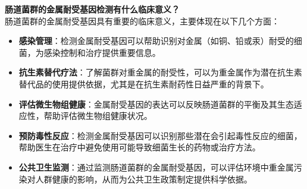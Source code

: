\documentclass[UTF8]{ctexart}
\begin{document}
\begin{tcolorbox}[
    enhanced,
    colback=lightpurple!10, %
    colframe=white,  %
    arc=3mm,
    boxrule=0.5pt,
    width=\textwidth,
    top=8pt,
    bottom=8pt
]
{\small{\color{lightpurple}\faQuestionCircle}\quad \textbf{肠道菌群的金属耐受基因检测有什么临床意义？}\\
{\color{orange!50}\faComments}\quad 肠道菌群的金属耐受基因具有重要的临床意义，主要体现在以下几个方面：
\begin{itemize}
    \item \textbf{感染管理}：检测金属耐受基因可以帮助识别对金属（如铜、铅或汞）耐受的细菌，为感染控制和治疗提供重要信息。
    \item \textbf{抗生素替代疗法}：了解菌群对重金属的耐受性，可以为重金属作为潜在抗生素替代品的使用提供依据，尤其是在抗生素耐药性日益严重的背景下。
    \item \textbf{评估微生物组健康}：金属耐受基因的表达可以反映肠道菌群的平衡及其生态适应性，帮助评估微生物组健康状况。
    \item \textbf{预防毒性反应}：检测金属耐受基因可以识别那些潜在会引起毒性反应的细菌，帮助医生在治疗中避免使用可能导致细菌生长的药物或治疗方法。
    \item \textbf{公共卫生监测}：通过监测肠道菌群的金属耐受基因，可以评估环境中重金属污染对人群健康的影响，从而为公共卫生政策制定提供科学依据。
\end{itemize}
}
\end{tcolorbox}

\newpage
\end{document}
